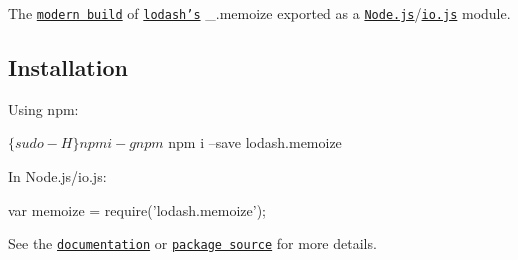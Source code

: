 The \href{https://github.com/lodash/lodash/wiki/Build-Differences}{\tt modern build} of \href{https://lodash.com/}{\tt lodash’s} {\ttfamily \+\_\+.\+memoize} exported as a \href{http://nodejs.org/}{\tt Node.\+js}/\href{https://iojs.org/}{\tt io.\+js} module.

\subsection*{Installation}

Using npm\+:


\begin{DoxyCode}
$ \{sudo -H\} npm i -g npm
$ npm i --save lodash.memoize
\end{DoxyCode}


In Node.\+js/io.js\+:


\begin{DoxyCode}
var memoize = require('lodash.memoize');
\end{DoxyCode}


See the \href{https://lodash.com/docs#memoize}{\tt documentation} or \href{https://github.com/lodash/lodash/blob/3.0.4-npm-packages/lodash.memoize}{\tt package source} for more details. 